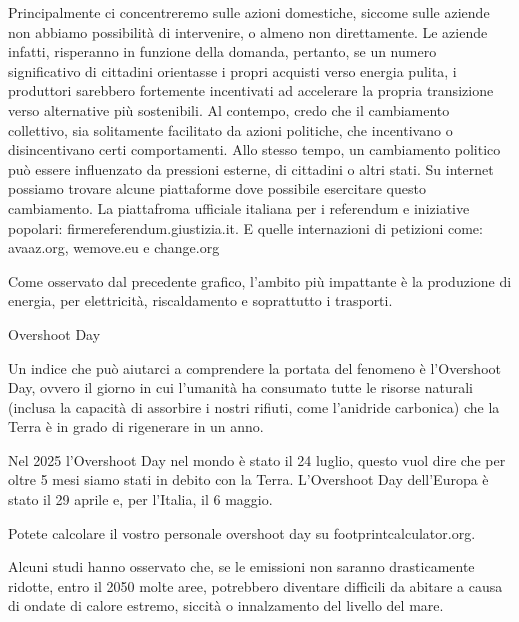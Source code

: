 \documentclass[12pt]{book} %
\begin{document}
Principalmente ci concentreremo sulle azioni domestiche, siccome sulle aziende non abbiamo possibilità di intervenire, o almeno non direttamente.
Le aziende infatti, risperanno in funzione della domanda, pertanto, se un numero significativo di cittadini orientasse i propri acquisti verso energia pulita, i produttori sarebbero fortemente incentivati ad accelerare la propria transizione verso alternative più sostenibili.
Al contempo, credo che il cambiamento collettivo, sia solitamente facilitato da azioni politiche, che incentivano o disincentivano certi comportamenti. Allo stesso tempo, un cambiamento politico può essere influenzato da pressioni esterne, di cittadini o altri stati.
Su internet possiamo trovare alcune piattaforme dove possibile esercitare questo cambiamento.
La piattafroma ufficiale italiana per i referendum e iniziative popolari: firmereferendum.giustizia.it. E quelle internazioni di petizioni come: avaaz.org, wemove.eu e change.org

Come osservato dal precedente grafico, l'ambito più impattante è la produzione di energia, per elettricità, riscaldamento e soprattutto i trasporti.

\begin{mdframed}[linewidth=1pt]
Overshoot Day

Un indice che può aiutarci a comprendere la portata del fenomeno è l'Overshoot Day, ovvero il giorno in cui l'umanità ha consumato tutte le risorse naturali (inclusa la capacità di assorbire i nostri rifiuti, come l'anidride carbonica) che la Terra è in grado di rigenerare in un anno.

Nel 2025 l'Overshoot Day nel mondo è stato il 24 luglio, questo vuol dire che per oltre 5 mesi siamo stati in debito con la Terra. L'Overshoot Day dell'Europa è stato il 29 aprile e, per l'Italia, il 6 maggio.

Potete calcolare il vostro personale overshoot day su footprintcalculator.org.

Alcuni studi hanno osservato che, se le emissioni non saranno drasticamente ridotte, entro il 2050 molte aree, potrebbero diventare difficili da abitare a causa di ondate di calore estremo, siccità o innalzamento del livello del mare.
\end{mdframed} 
\end{document}
